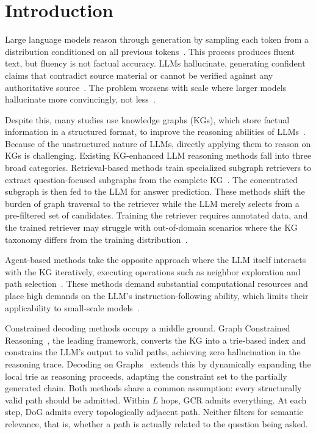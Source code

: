 
\section{Introduction}
\label{sec:intro}

Large language models reason through generation by sampling each token from a distribution conditioned on all previous tokens~\citep{brown2020gpt3,touvron2023llama}. This process produces fluent text, but fluency is not factual accuracy. LLMs hallucinate, generating confident claims that contradict source material or cannot be verified against any authoritative
source~\citep{ji2023survey,huang2023survey}. The problem worsens with scale where larger models hallucinate more convincingly, not less~\citep{lin2022truthfulqa}.

Despite this, many studies use knowledge graphs (KGs), which store factual information in a structured format, to improve the reasoning abilities of LLMs~\citep{pan2024survey,luo2024rog}. Because of the unstructured nature of LLMs, directly applying them to reason on KGs is challenging. Existing KG-enhanced LLM reasoning methods fall into three broad categories. Retrieval-based methods train specialized subgraph retrievers to extract question-focused subgraphs from the complete KG~\citep{luo2024rog,mavromatis2022rearev}. The concentrated subgraph is then fed to the LLM for answer prediction. These methods shift the burden of graph traversal to the retriever while the LLM merely selects from a pre-filtered set of candidates. Training the retriever requires annotated data, and the trained retriever may struggle with out-of-domain scenarios where the KG taxonomy differs from the training distribution~\citep{li2024-decoding-on-graphs}.

Agent-based methods take the opposite approach where the LLM itself interacts with the KG iteratively, executing operations such as neighbor exploration and path selection~\citep{jiang2023structgpt}. These methods demand substantial computational resources and place high demands on the LLM's instruction-following ability, which limits their applicability to small-scale models~\citep{li2024-decoding-on-graphs}.

Constrained decoding methods occupy a middle ground. Graph Constrained Reasoning~\citep{luo2025-graph-constrained-reasoning}, the leading framework, converts the KG into a trie-based index and constrains the LLM's output to valid paths, achieving zero hallucination in the reasoning trace. Decoding on Graphs~\citep{li2024-decoding-on-graphs} extends this by dynamically expanding the local trie as reasoning proceeds, adapting the constraint set to the partially generated chain. Both methods share a common assumption: every structurally valid path should be admitted. Within $L$ hops, GCR admits everything. At each step, DoG admits every topologically adjacent path. Neither filters for semantic relevance, that is, whether a path is actually related to the question being asked.

